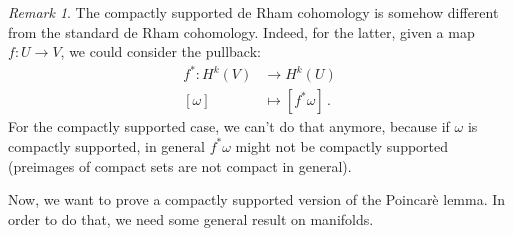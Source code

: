 \documentclass[a4paper,11pt,titlepage, article, oneside]{memoir}
\numberwithin{equation}{section}
\theoremstyle{definition}
\theoremstyle{remark}
\newtheorem{remark}[theorem]{Remark}
\begin{document}
\begin{remarkbox}
\begin{remark}
The compactly supported de Rham cohomology is somehow different from the standard de Rham cohomology. Indeed, for the latter, given a map $f \colon U \rightarrow V$, we could consider the pullback:
\begin{align*}
f^* \colon H^k(V) &\rightarrow H^k(U) \\
[\omega] &\mapsto [f^* \omega] \, .
\end{align*}
For the compactly supported case, we can't do that anymore, because if $\omega$ is compactly supported, in general $f^* \omega$ might not be compactly supported (preimages of compact sets are not compact in general).
\end{remark}
\end{remarkbox}

Now, we want to prove a compactly supported version of the Poincarè lemma. In order to do that, we need some general result on manifolds.
\end{document}

